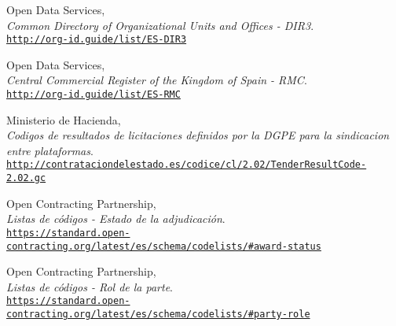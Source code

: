 \begin{thebibliography}{X}
            Open Data Services,
            \\ \textit{Common Directory of Organizational Units and Offices - DIR3}.
            \\ \texttt{\url{http://org-id.guide/list/ES-DIR3}}
            
            Open Data Services,
            \\ \textit{Central Commercial Register of the Kingdom of Spain - RMC}.
            \\ \texttt{\url{http://org-id.guide/list/ES-RMC}}
        
            Ministerio de Hacienda,
            \\ \textit{Codigos de resultados de licitaciones definidos por la DGPE para la sindicacion entre plataformas}.
            \\ \texttt{\url{http://contrataciondelestado.es/codice/cl/2.02/TenderResultCode-2.02.gc}}
            
            Open Contracting Partnership,
            \\ \textit{Listas de códigos - Estado de la adjudicación}.
            \\ \texttt{\url{https://standard.open-contracting.org/latest/es/schema/codelists/\#award-status}}
            
            Open Contracting Partnership,
            \\ \textit{Listas de códigos - Rol de la parte}.
            \\ \texttt{\url{https://standard.open-contracting.org/latest/es/schema/codelists/\#party-role}}
        
    \end{thebibliography}
\endgroup

\newpage